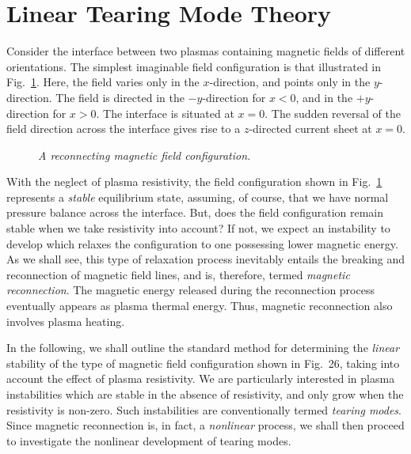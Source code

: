 \section{Linear Tearing Mode Theory}
Consider the interface between two plasmas  containing magnetic fields of
different orientations. The simplest imaginable field configuration is that
illustrated in Fig.~\ref{f26}. Here, the field varies only in the $x$-direction, and 
points only in the $y$-direction. The field is directed in the
$-y$-direction for $x<0$, and in the $+y$-direction for $x>0$. The interface
is situated at $x=0$. The sudden reversal of the field direction across the
interface gives rise to a $z$-directed current sheet at $x=0$. 

\begin{figure}
\epsfysize=3in
\centerline{}
\caption{\em A reconnecting magnetic field configuration.}\label{f26}
\end{figure}

With the neglect of plasma resistivity, the field configuration shown in Fig.~\ref{f26}
represents a {\em  stable} equilibrium state, assuming, of course,
 that we have normal pressure balance
across the interface. But, does the field configuration remain stable when we take
resistivity into account? If not, we expect an instability to develop which relaxes the
configuration to one possessing  lower magnetic energy. As we shall see, this
type of relaxation process inevitably entails the breaking and reconnection of magnetic
field lines, and is, therefore, termed {\em magnetic reconnection}. The
magnetic energy released during the reconnection process eventually appears as 
plasma thermal
energy. Thus, magnetic reconnection also involves plasma heating.

In the following, we shall outline the standard method for determining the
{\em linear} stability of the type of magnetic field configuration
shown in Fig.~26, taking into account the effect of plasma resistivity.
We are particularly
interested in plasma instabilities which are stable in the absence of resistivity,
and only grow when the resistivity is non-zero. Such instabilities are
conventionally termed {\em tearing modes}. 
Since magnetic reconnection is, in fact, a {\em nonlinear} process, we shall
then proceed to  investigate the nonlinear development of tearing modes.


